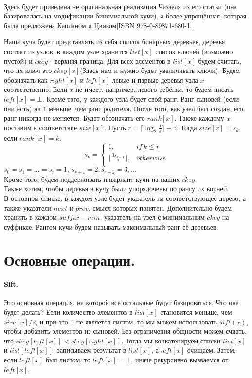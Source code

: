 \documentclass{article}
\begin{document}
		\paragraph{}
		Здесь будет приведена не оригинальная реализация Чаззеля из его статьи (она базировалась на модификации биномиальной кучи), а более упрощённая, которая  была предложена Капланом и Цвиком[ISBN 978-0-89871-680-1].
		
		Наша куча будет представлять из себя список бинарных деревьев, деревья состоят из узлов, в каждом узле хранится $list[x]$ список ключей (возможно пустой) и $ckey$ - верхняя граница. Для всех элементов в $list[x]$ будем считать, что их ключ это $ckey[x]$(Здесь нам и нужно будет увеличивать ключи). Будем обозначать как $right[x]$ и $left[x]$ левые и парвые деревья узла $x$ соответственно. Если $x$ не имеет, например, левого ребёнка, то будем писать $left[x] = \bot$. Кроме того, у  каждого узла будет свой ранг. Ранг сыновей (если они есть) на $1$ меньше, чем ранг родителя. После того, как узел был создан, его ранг никогда не меняется. Будет обозначать его $rank[x]$. Также каждому $x$ поставим в соответствие $size[x]$. Пусть $r = \lceil\log_2\frac{1}{\varepsilon}\rceil + 5$. Тогда $size[x] = s_k$, если $rank[x] = k$. 
		$$s_k = \left\{ \begin{array}{ll}
		1, & if\ k \leq r\\
		\lceil \frac{3s_{k - 1}}{2} \rceil, & otherwise\\
		\end{array}\right.$$
		$s_0 = s_1 = ... = s_r = 1,\ s_{r+1} = 2, s_{r+2} = 3,...$\\
		Кроме того, будем поддерживать инвариант кучи на наших $ckey$.\\
		Также хотим, чтобы  деревья в кучу были упорядочены по рангу их корней.\\
		В основном списке, в каждом узле будет указатель на соответствующее дерево, а также указатели $next$ и $prev$, смысл которых понятен. Дополнительно будем хранить в каждом $suffix-min$, указатель на узел с минимальным $ckey$ на суффиксе. Рангом кучи будем называть максимальный ранг её деревьев.
	\section{Основные операции.}
		\paragraph{Sift.} 
		Это основная операция,  на которой все остальные будут базироваться. Что она  будет делать? Если количество элементов в $list[x]$ становится меньше, чем $size[x] / 2$, и при это $x$ не является листом, то мы можем использовать $sift(x)$, чтобы добавить элементов из сыновей. Без ограничения общности можем счиать, что $ckey[left[x]] < ckey[right[x]]$. Тогда мы конкатенируем списки $list[x]$ и $list[left[x]]$, записываем результат в $list[x]$, а $left[x]$ очищаем. Затем, если $left[x]$ был листом, то $left[x] = \bot$, иначе рекурсивно вызваемся от $left[x]$.
\end{document}
